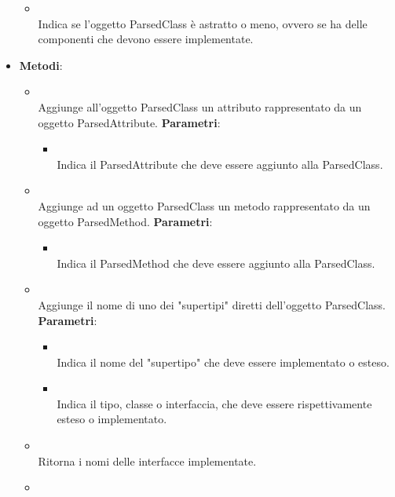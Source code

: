 \begin{itemize}
\begin{itemize}
\item {}
\\ Indica se l'oggetto ParsedClass è astratto o meno, ovvero se ha delle componenti che devono essere implementate.
\end{itemize}
\item \textbf{Metodi}:
\begin{itemize}
\item {}
\\ Aggiunge all'oggetto ParsedClass un attributo rappresentato da un oggetto ParsedAttribute.
\textbf{Parametri}:
\begin{itemize}
\item {}
\\ Indica il ParsedAttribute che deve essere aggiunto alla ParsedClass.
\end{itemize}
\item {}
\\ Aggiunge ad un oggetto ParsedClass un metodo rappresentato da un oggetto ParsedMethod.
\textbf{Parametri}:
\begin{itemize}
\item {}
\\ Indica il ParsedMethod che deve essere aggiunto alla ParsedClass.
\end{itemize}
\item {}
\\ Aggiunge il nome di uno dei "supertipi" diretti dell'oggetto ParsedClass.
\textbf{Parametri}:
\begin{itemize}
\item {}
\\ Indica il nome del "supertipo" che deve essere implementato o esteso.
\item {}
\\ Indica il tipo, classe o interfaccia, che deve essere rispettivamente esteso o implementato.
\end{itemize}
\item {}
\\ Ritorna i nomi delle interfacce implementate.
\item {}

\end{itemize}
\end{itemize}
